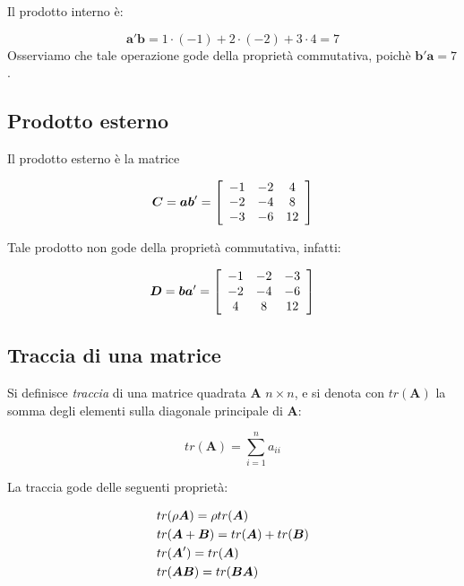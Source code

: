 \documentclass[
  11pt,
]{krantz}
\theoremstyle{definition}
\theoremstyle{definition}
\theoremstyle{definition}
\theoremstyle{definition}
\theoremstyle{remark}
\begin{document}
Il prodotto interno è:

\[\boldsymbol{a}'\boldsymbol{b}= 1 \cdot (-1) + 2 \cdot (-2) + 3
\cdot 4 = 7\] Osserviamo che tale operazione gode della proprietà commutativa, poichè \(\boldsymbol{b}'\boldsymbol{a}=7\).

\hypertarget{prodotto-esterno}{%
\subsection{Prodotto esterno}\label{prodotto-esterno}}

Il prodotto esterno è la matrice

\[\boldsymbol{C} = \boldsymbol{a}\boldsymbol{b}'= \left[
\begin{array}{c c c}
-1 & -2 & 4\\
-2 & -4 & 8\\
-3 & -6 & 12
\end{array}
 \right]\]

Tale prodotto non gode della proprietà commutativa, infatti:

\[\boldsymbol{D} = \boldsymbol{b}\boldsymbol{a}'= \left[
\begin{array}{c c c}
-1 & -2 & -3\\
-2 & -4 & -6\\
4 & 8 & 12
\end{array}
 \right]\]

\hypertarget{traccia-di-una-matrice}{%
\subsection{Traccia di una matrice}\label{traccia-di-una-matrice}}

Si definisce \emph{traccia} di una matrice quadrata \(\boldsymbol{A}\) \(n \times n\), e si denota con \(tr(\boldsymbol{A})\) la somma degli elementi sulla diagonale principale di \(\boldsymbol{A}\):

\[tr(\boldsymbol{A}) = \sum_{i=1}^{n} a_{ii}\]

La traccia gode delle seguenti proprietà:

\[\begin{aligned}
&tr(\rho \boldsymbol{A}) = \rho tr( \boldsymbol{A}) \notag \\
&tr(\boldsymbol{A} + \boldsymbol{B}) =  tr( \boldsymbol{A})+tr( \boldsymbol{B}) \notag \\
&tr(\boldsymbol{A}') =  tr( \boldsymbol{A}) \notag \\
&tr(\boldsymbol{AB}) =  tr( \boldsymbol{BA}) \notag\end{aligned}\]
\end{document}
